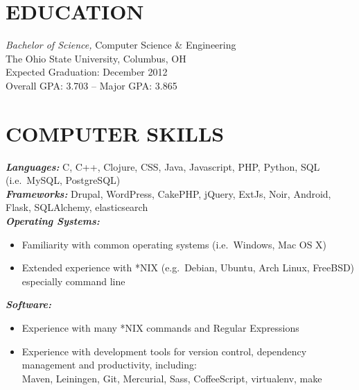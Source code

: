 \documentclass[line,letterpaper]{resume}
\begin{document}
\address{2092 Middlesex road, Columbus, OH 43220}
\address{\href{mailto:ryan@ryanmcg.com}{ryan@ryanmcg.com} -- (614) 678-4408 --
\href{https://github.com/RyanMcG}{RyanMcG on GitHub}}


\begin{resume}
    \vspace{-24pt}
    \section{\uppercase{Education}} {\sl Bachelor of Science,} \/Computer
    Science \& Engineering \\
    The Ohio State University, Columbus, OH \\
    Expected Graduation: December 2012 \\
    Overall GPA: 3.703 -- Major GPA: 3.865 \\

    \vspace{-16pt}

    \section{\uppercase{Computer Skills}}
    {\sl\textbf{Languages:}}
    \/C, C++, Clojure, CSS, Java, Javascript, PHP, Python, SQL
    (i.e.~MySQL, PostgreSQL) \\
    {\sl\textbf{Frameworks:}} 
    \/Drupal, WordPress, CakePHP, jQuery, ExtJs, Noir, Android, Flask,
    SQLAlchemy, elasticsearch \\
    {\sl\textbf{Operating Systems: }} \hfill 
    \begin{itemize}
        \item Familiarity with common operating systems (i.e.~Windows, Mac OS X)
        \item Extended experience with *NIX (e.g.~Debian, Ubuntu, Arch Linux,
            FreeBSD) especially command line
    \end{itemize}
    \vspace{-10pt}
    {\sl\textbf{Software:}} \hfill 
    \begin{itemize}
        \item Experience with many *NIX commands and Regular Expressions
        \item Experience with development tools for version control, dependency
            management and productivity, including: \\
            Maven, Leiningen, Git, Mercurial, Sass, CoffeeScript,
            virtualenv, make\\
    \end{itemize}


\end{resume}
\end{document}
